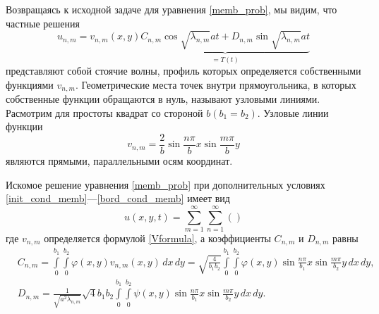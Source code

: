 Возвращаясь к исходной задаче для уравнения \eqref{memb_prob}, мы видим, что частные решения
\begin{equation}
	u_{n, m} = v_{n, m}(x, y) \underbrace{C_{n, m} \cos{\sqrt{\lambda_{n, m}} a t} + D_{n, m} \sin{\sqrt{\lambda_{n, m}} a t}}_{=T(t)}
\end{equation}
представляют собой стоячие волны, профиль которых определяется собственными функциями $v_{n, m}$. Геометрические места точек внутри прямоугольника, в которых собственные функции обращаются в нуль, называют узловыми линиями. Расмотрим для простоты квадрат со стороной $b (b_1 = b_2)$. Узловые линии функции 
\begin{equation}
	v_{n, m} = \frac{2}{b} \sin{\frac{n \pi}{b} x} \sin{\frac{m \pi}{b} y}
\end{equation}
являются прямыми, параллельными осям координат. 

Искомое решение уравнения \eqref{memb_prob} при дополнительных условиях \eqref{init_cond_memb}---\eqref{bord_cond_memb} имеет вид
\begin{equation*}
	u(x, y, t) = \sum \limits_{m = 1}^{\infty} \sum \limits_{n = 1}^{\infty} ()
\end{equation*}
где $v_{n, m}$ определяется формулой \eqref{Vformula}, а коэффициенты $C_{n, m}$ и $D_{n, m}$ равны
\begin{align*}
	&C_{n, m} = \int \limits_{0}^{b_1} \int \limits_{0}^{b_2} \varphi(x, y) v_{n, m}(x, y) \, dx \, dy = \sqrt{\frac{4}{b_1 b_2}} \int \limits_{0}^{b_1} \int \limits_{0}^{b_2} \varphi(x, y) \sin{\frac{n \pi}{b_1} x} \sin{\frac{m \pi}{b_2} y} \, dx \, dy, \\
	&D_{n, m} = \frac{1}{\sqrt{a^2 \lambda_{n, m}}} \sqrt{4}{b_1 b_2} \int \limits_{0}^{b_1} \int \limits_{0}^{b_2} \psi(x, y) \sin{\frac{n \pi}{b_1} x} \sin{\frac{m \pi}{b_2} y} \, dx \, dy. 
\end{align*}